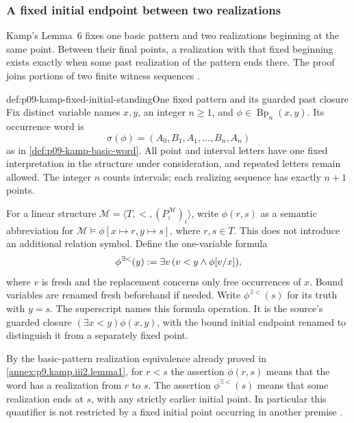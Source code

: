 
\subsubsection{A fixed initial endpoint between two realizations}
\label{sec:p09-kamp-iii2-lemma6}

Kamp's Lemma~6 fixes one basic pattern and two realizations beginning at
the same point. Between their final points, a realization with that
fixed beginning exists exactly when some past realization of the pattern
ends there. The proof joins portions of two finite witness sequences
\cite[ch.~III, lemma~6, pp.~79--80]{Kamp1968}.

\begin{hbconvention}{def:p09-kamp-fixed-initial-standing}{One fixed pattern and its guarded past closure}
Fix distinct variable names \(x,y\), an integer \(n\geq1\), and
\(\phi\in\operatorname{Bp}_n(x,y)\). Its occurrence word is
\[
                 \sigma(\phi)=(A_0,B_1,A_1,\ldots,B_n,A_n)
\]
as in \cref{def:p09-kamp-basic-word}. All point and interval letters
have one fixed interpretation in the structure under consideration,
and repeated letters remain allowed. The integer \(n\) counts
intervals; each realizing sequence has exactly \(n+1\) points.

For a linear structure
\(\mathcal M=\langle T,<,(P_i^{\mathcal M})_i\rangle\), write
\(\phi(r,s)\) as a semantic abbreviation for
\(\mathcal M\models\phi[x\mapsto r,y\mapsto s]\), where \(r,s\in T\).
This does not introduce an additional relation symbol.
Define the one-variable formula
\[
 \phi^{\exists<}(y)\mathrel{:=}
             \exists v\,(v<y\land\phi[v/x]),
\]
where \(v\) is fresh and the replacement concerns only free occurrences
of \(x\). Bound variables are renamed fresh beforehand if needed.
Write \(\phi^{\exists<}(s)\) for its truth with \(y=s\).
The superscript names this formula operation. It is the source's
guarded closure \((\exists x<y)\phi(x,y)\), with the bound initial
endpoint renamed to distinguish it from a separately fixed point.

By the basic-pattern realization equivalence already proved in
\cref{annex:p9.kamp.iii2.lemma1}, for \(r<s\) the assertion
\(\phi(r,s)\) means that the word has a realization from \(r\)
to \(s\). The assertion \(\phi^{\exists<}(s)\) means that some
realization ends at \(s\), with any strictly earlier initial point.
In particular this quantifier is not restricted by a fixed initial
point occurring in another premise
\cite[ch.~III, pp.~63--66, 79]{Kamp1968}.
\end{hbconvention}

